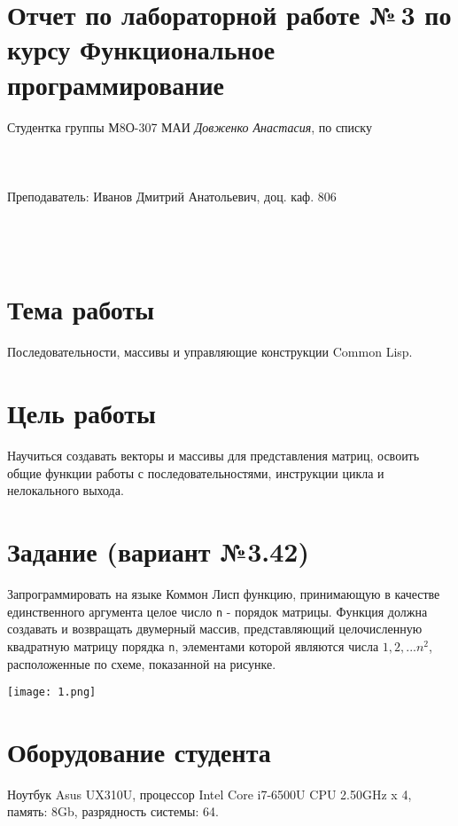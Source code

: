 \documentclass[12pt]{article}
\begin{document}
\section*{Отчет по лабораторной работе №\,3
по курсу \guillemotleft  Функциональное программирование\guillemotright}
\begin{flushright}
Студентка группы М8О-307 МАИ \textit{Довженко Анастасия},  по списку \\
 \\
 \\
\ \\
Преподаватель: Иванов Дмитрий Анатольевич, доц. каф. 806 \\
 \\
 \\
 \\

\end{flushright}

\section{Тема работы}
Последовательности, массивы и управляющие конструкции Common Lisp.

\section{Цель работы}
Научиться создавать векторы и массивы для представления матриц, освоить общие функции работы с последовательностями, инструкции цикла и нелокального выхода.

\section{Задание (вариант №3.42)}
Запрограммировать на языке Коммон Лисп функцию, принимающую в качестве единственного аргумента целое число {\tt n} - порядок матрицы. Функция должна создавать и возвращать двумерный массив, представляющий целочисленную квадратную матрицу порядка {\tt n}, элементами которой являются числа {\tt $1, 2, ... n^{2}$}, расположенные по схеме, показанной на рисунке.

\texttt{[image: 1.png]}

\section{Оборудование студента}
Ноутбук Asus UX310U, процессор Intel Core i7-6500U CPU 2.50GHz x 4, память: 8Gb, разрядность системы: 64.
\end{document}
